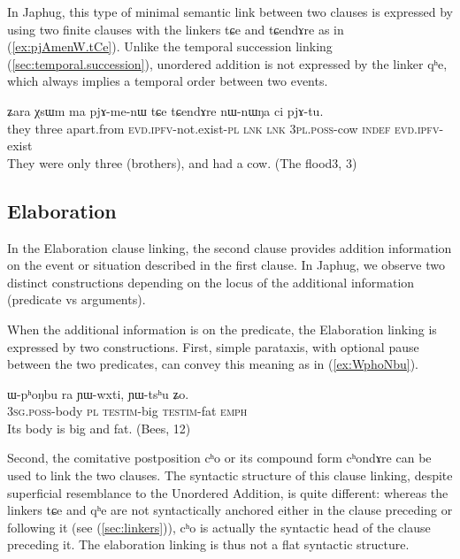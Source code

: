 \documentclass[oldfontcommands,oneside,a4paper,11pt]{article}
\newcommand{\ipa}[1]{{\phon \mbox{#1}}} %
\newcommand{\refb}[1]{(\ref{#1})}
\begin{document}
In Japhug, this type of minimal semantic link between two clauses is expressed by using two finite clauses with the linkers \ipa{tɕe} and \ipa{tɕendɤre}  as in \refb{ex:pjAmenW.tCe}. Unlike the  temporal succession linking \refb{sec:temporal.succession}, unordered addition is not expressed by  the linker \ipa{qʰe}, which   always implies a temporal order between two events.

 \begin{exe}
\ex \label{ex:pjAmenW.tCe}
\gll
\ipa{ʑara}  	\ipa{χsɯm}  	\ipa{ma}  	\ipa{pjɤ-me-nɯ}  	\ipa{tɕe}  	\ipa{tɕendɤre}  	\ipa{nɯ-nɯŋa}  	\ipa{ci}  	\ipa{pjɤ-tu.}  \\
they three apart.from \textsc{evd.ipfv}-not.exist-\textsc{pl} \textsc{lnk} \textsc{lnk} \textsc{3pl.poss}-cow \textsc{indef} \textsc{evd.ipfv}-exist \\
\glt They were only three (brothers), and had a cow. (The flood3, 3)
\end{exe}


\subsection{Elaboration} \label{sec:elaboration}
In the Elaboration clause linking, the second clause provides addition information on the event or situation described in the first clause. In Japhug, we observe two distinct constructions depending on the locus of the additional information (predicate vs arguments).


When the additional information is on the predicate, the Elaboration linking is expressed by two constructions. First, simple parataxis, with optional pause between the two predicates, can convey this meaning as in \refb{ex:WphoNbu}.

\begin{exe}
\ex \label{ex:WphoNbu}
\gll
 \ipa{ɯ-pʰoŋbu}  	\ipa{ra}  	\ipa{ɲɯ-wxti,}  	\ipa{ɲɯ-tsʰu}  	\ipa{ʑo.}  \\
\textsc{3sg.poss}-body \textsc{pl} \textsc{testim}-big \textsc{testim}-fat \textsc{emph} \\
\glt Its body is big and fat. (Bees, 12)
\end{exe}

Second,  the comitative postposition \ipa{cʰo} or its compound form  \ipa{cʰondɤre} can be used to link the two clauses. The syntactic structure of this clause linking, despite superficial resemblance to the Unordered Addition, is quite different: whereas the linkers \ipa{tɕe} and \ipa{qʰe} are not syntactically anchored either in the clause preceding or following it (see \refb{sec:linkers}), \ipa{cʰo} is actually the syntactic head of the clause preceding it. The elaboration linking is thus not a flat syntactic structure.
\end{document}
